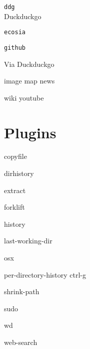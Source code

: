 \documentclass[a4paper,landscape,columns=3]{cheatsheet}
\newcommand{\code}{\texttt}
\newcommand{\codequiv}{\dsm}
\begin{document}
\code{ddg}\\
Duckduckgo

\code{ecosia}

\code{github}

Via Duckduckgo

\ttfamily

image \qquad map \qquad news

wiki \qquad youtube

\columnbreak

\section{Plugins}

copyfile

dirhistory 

extract

forklift

history

last-working-dir

osx

per-directory-history {\codequiv{(}}ctrl-g{\codequiv{)}}

shrink-path

sudo

wd

web-search 
\end{document}
